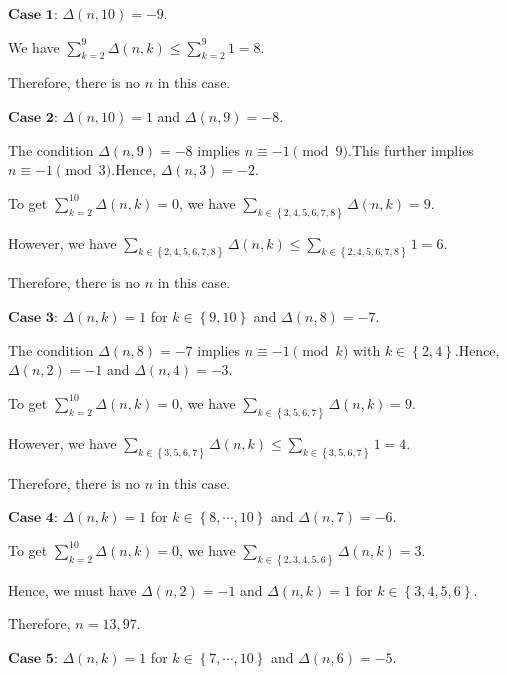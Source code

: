 \begin{enumerate}
 $\textbf{Case 1}$: $\Delta \left( n, 10 \right) = - 9$.

 We have $\sum_{k = 2}^9 \Delta \left( n, k \right) \leq \sum_{k = 2}^9 1 = 8$.

 Therefore, there is no $n$ in this case.

 $\textbf{Case 2}$: $\Delta \left( n, 10 \right) = 1$ and $\Delta \left( n, 9 \right) = -8$.

 The condition $\Delta \left( n, 9 \right) = -8$ implies $n \equiv - 1 \pmod{9}$.This further implies $n \equiv - 1 \pmod{3}$.Hence, $\Delta \left( n, 3 \right) = -2$.

 To get $\sum_{k = 2}^{10} \Delta \left( n, k \right) = 0$, we have $\sum_{k \in \left\{ 2 , 4 , 5 , 6, 7, 8\right\}} \Delta \left( n, k \right) = 9$.

 However, we have $\sum_{k \in \left\{ 2 , 4 , 5 , 6, 7, 8\right\}} \Delta \left( n, k \right) \leq \sum_{k \in \left\{ 2 , 4 , 5 , 6, 7, 8\right\}}  1 = 6$.

 Therefore, there is no $n$ in this case.

 $\textbf{Case 3}$: $\Delta \left( n, k \right) = 1$ for $k \in \left\{ 9 , 10 \right\}$ and $\Delta \left( n, 8 \right) = -7$.

 The condition $\Delta \left( n, 8 \right) = -7$ implies $n \equiv - 1 \pmod{k}$ with $k \in \left\{ 2, 4 \right\}$.Hence, $\Delta \left( n, 2 \right) = -1$ and $\Delta \left( n, 4 \right) = -3$.

 To get $\sum_{k = 2}^{10} \Delta \left( n, k \right) = 0$, we have $\sum_{k \in \left\{ 3, 5, 6, 7 \right\}} \Delta \left( n, k \right) = 9$.

 However, we have $\sum_{k \in \left\{ 3, 5, 6, 7 \right\}} \Delta \left( n, k \right) \leq \sum_{k \in \left\{ 3, 5, 6, 7 \right\}}  1 = 4$.

 Therefore, there is no $n$ in this case.

 $\textbf{Case 4}$: $\Delta \left( n, k \right) = 1$ for $k \in \left\{ 8, \cdots , 10 \right\}$ and $\Delta \left( n, 7 \right) = -6$.

 To get $\sum_{k = 2}^{10} \Delta \left( n, k \right) = 0$, we have $\sum_{k \in \left\{ 2, 3, 4, 5, 6 \right\}} \Delta \left( n, k \right) = 3$.

 Hence, we must have $\Delta \left( n, 2 \right) = -1$ and $\Delta \left( n, k \right) = 1$ for $k \in \left\{ 3 , 4 , 5 , 6 \right\}$.

 Therefore, $n = 13, 97$.

 $\textbf{Case 5}$: $\Delta \left( n, k \right) = 1$ for $k \in \left\{ 7 , \cdots , 10 \right\}$ and $\Delta \left( n, 6 \right) = -5$.


\end{enumerate}
